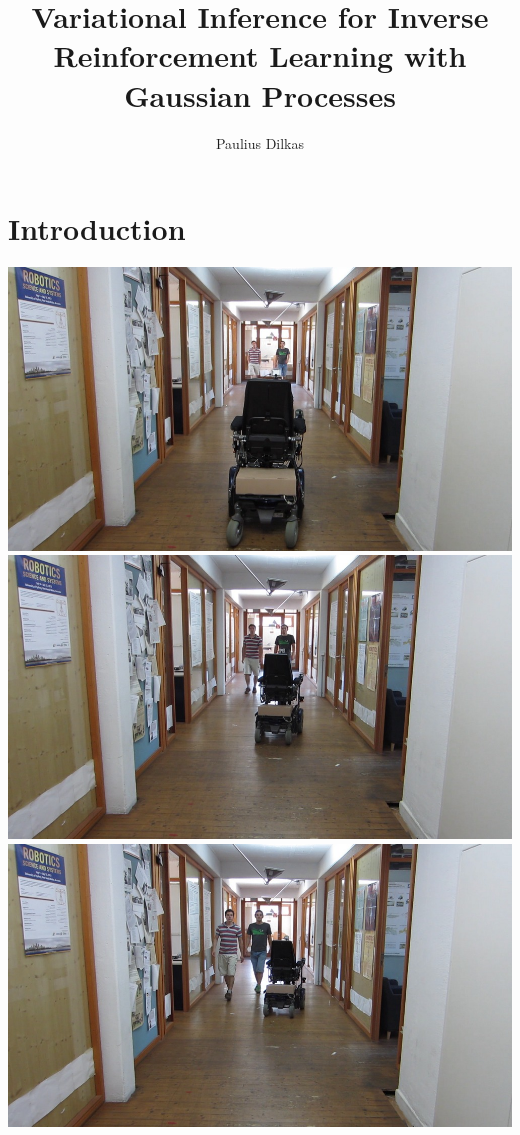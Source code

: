 \documentclass{beamer}
\author{Paulius Dilkas}
\title{Variational Inference for Inverse Reinforcement Learning with Gaussian
  Processes}
\begin{document}
\maketitle

\section{Introduction}

\begin{frame}
  \begin{overprint}
    \includegraphics[width=\textwidth]{images/image-044.jpg}
    \includegraphics[width=\textwidth]{images/image-045.jpg}
    \includegraphics[width=\textwidth]{images/image-048.jpg}

\end{overprint}
\end{frame}
\end{document}
